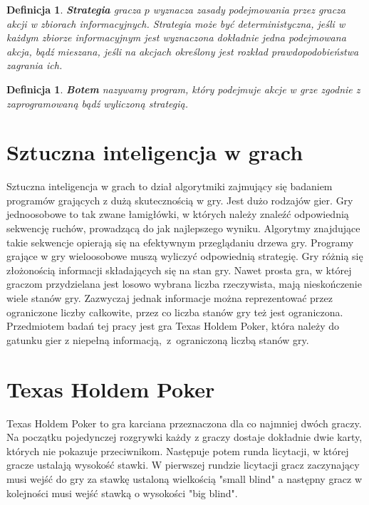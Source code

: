 \documentclass[magisterska]{pracamgr}
\newtheorem{definition}[theorem]{Definicja}
\begin{document}
\begin{definition}
      \textbf{Strategia} gracza $p$ wyznacza zasady podejmowania przez gracza akcji w zbiorach informacyjnych.
      Strategia może być deterministyczna, jeśli w każdym zbiorze informacyjnym jest wyznaczona dokładnie
      jedna podejmowana akcja, bądź mieszana, jeśli na akcjach określony jest rozkład prawdopodobieństwa
      zagrania ich.
\end{definition}

\begin{definition}
      \textbf{Botem} nazywamy program, który podejmuje akcje w grze zgodnie z zaprogramowaną bądź wyliczoną strategią.
\end{definition}

\section{Sztuczna inteligencja w grach}

Sztuczna inteligencja w grach to dział algorytmiki zajmujący się badaniem programów grających
z dużą skutecznością w gry. Jest dużo rodzajów gier. Gry jednoosobowe to tak zwane łamigłówki, w których
należy znaleźć odpowiednią sekwencję ruchów, prowadzącą do jak najlepszego wyniku. Algorytmy znajdujące
takie sekwencje opierają się na efektywnym przeglądaniu drzewa gry. Programy grające w gry wieloosobowe
muszą wyliczyć odpowiednią strategię. Gry różnią się złożonością informacji składających się na stan gry.
Nawet prosta gra, w której graczom przydzielana jest losowo wybrana liczba rzeczywista, mają nieskończenie
wiele stanów gry. Zazwyczaj jednak informacje można reprezentować przez ograniczone liczby całkowite, przez co
liczba stanów gry też jest ograniczona. Przedmiotem badań tej pracy jest gra Texas Holdem Poker, która
należy do gatunku gier z niepełną informacją,~z~ograniczoną liczbą stanów gry.

\section{Texas Holdem Poker}

Texas Holdem Poker to gra karciana przeznaczona dla co najmniej dwóch graczy. Na początku pojedynczej rozgrywki każdy z graczy
dostaje dokładnie dwie karty, których nie pokazuje przeciwnikom. Następuje potem runda licytacji, w której
gracze ustalają wysokość stawki. W pierwszej rundzie licytacji gracz zaczynający musi wejść do gry
za stawkę ustaloną wielkością "small blind" a następny gracz w kolejności musi wejść stawką o wysokości
"big blind". \\
\end{document}
